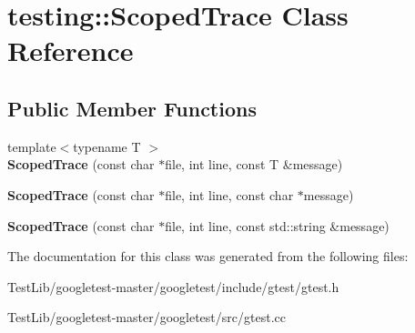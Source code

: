 \hypertarget{classtesting_1_1ScopedTrace}{}\section{testing\+:\+:Scoped\+Trace Class Reference}
\label{classtesting_1_1ScopedTrace}
\subsection*{Public Member Functions}
\begin{DoxyCompactItemize}
\item 
\mbox{\label{classtesting_1_1ScopedTrace_a2da90b95d682d518cca472934d53c59c}} 
{\footnotesize template$<$typename T $>$ }\\{\bfseries Scoped\+Trace} (const char $\ast$file, int line, const T \&message)
\item 
\mbox{\label{classtesting_1_1ScopedTrace_accd2a06cc941ffd7d6fe109adfdb4f19}} 
{\bfseries Scoped\+Trace} (const char $\ast$file, int line, const char $\ast$message)
\item 
\mbox{\label{classtesting_1_1ScopedTrace_a1f453a2aade0db6955a111a7cb329615}} 
{\bfseries Scoped\+Trace} (const char $\ast$file, int line, const std\+::string \&message)
\end{DoxyCompactItemize}


The documentation for this class was generated from the following files\+:\begin{DoxyCompactItemize}
\item 
Test\+Lib/googletest-\/master/googletest/include/gtest/gtest.\+h\item 
Test\+Lib/googletest-\/master/googletest/src/gtest.\+cc\end{DoxyCompactItemize}
